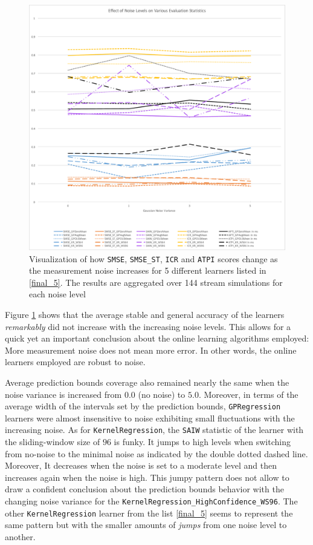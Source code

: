 \begin{figure}[htbp]
  \centering
    \includegraphics[width=\linewidth]{./Figures/noise_effect_on_final_5.pdf}
  \caption{Visualization of how \texttt{SMSE}, \texttt{SMSE\_ST}, \texttt{ICR} and \texttt{ATPI} scores change as the measurement noise increases for 5 different learners listed in \ref{final_5}. The results are aggregated over 144 stream simulations for each noise level}
  \label{fig:noise_effect_on_final_5}
\end{figure}

Figure \ref{fig:noise_effect_on_final_5} shows that the average stable and general accuracy of the learners \textit{remarkably} did not increase with the increasing noise levels. This allows for a quick yet an important conclusion about the online learning algorithms employed: More measurement noise does not mean more error. In other words, the online learners employed are robust to noise.

Average prediction bounds coverage also remained nearly the same when the noise variance is increased from $0.0$ (no noise) to $5.0$. Moreover, in terms of the average width of the intervals set by the prediction bounds, \texttt{GPRegression} learners were almost insensitive to noise exhibiting small fluctuations with the increasing noise. As for \texttt{KernelRegression}, the \texttt{SAIW} statistic of the learner with the sliding-window size of $96$ is funky. It jumps to high levels when switching from no-noise to the minimal noise as indicated by the double dotted dashed line. Moreover, It decreases when the noise is set to a moderate level and then increases again when the noise is high. This jumpy pattern does not allow to draw a confident conclusion about the prediction bounds behavior with the changing noise variance for the \texttt{KernelRegression\_HighConfidence\_WS96}. The other \texttt{KernelRegression} learner from the list \ref{final_5} seems to represent the same pattern but with the smaller amounts of \textit{jumps} from one noise level to another. 

